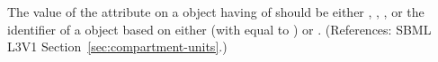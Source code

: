 The value of the attribute  on a \Compartment object having
 of  should be either ,
, , or the identifier of a \UnitDefinition
object based on either  (with  equal to
) or .  (References: SBML L3V1
Section~\ref{sec:compartment-units}.)
